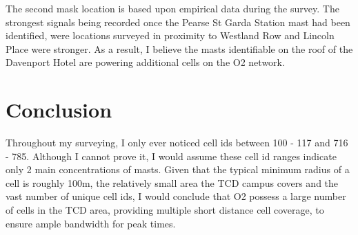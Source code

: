 \documentclass[a4paper,12pt]{article}
\begin{document}
The second mask location is based upon empirical data during the survey.
The strongest signals being recorded once the Pearse St Garda Station
mast had been identified, were locations surveyed in proximity to
Westland Row and Lincoln Place were stronger. As a result, I believe the
masts identifiable on the roof of the Davenport Hotel are powering
additional cells on the O2 network.

\section{Conclusion}

Throughout my surveying, I only ever noticed cell ids between 100 - 117
and 716 - 785. Although I cannot prove it, I would assume these cell id
ranges indicate only 2 main concentrations of masts. Given that the
typical minimum radius of a cell is roughly 100m, the relatively small
area the TCD campus covers and the vast number of unique cell ids, I 
would conclude that O2 possess a large number of cells in the TCD 
area, providing multiple short distance cell coverage,
to ensure ample bandwidth for peak times.
\end{document}
